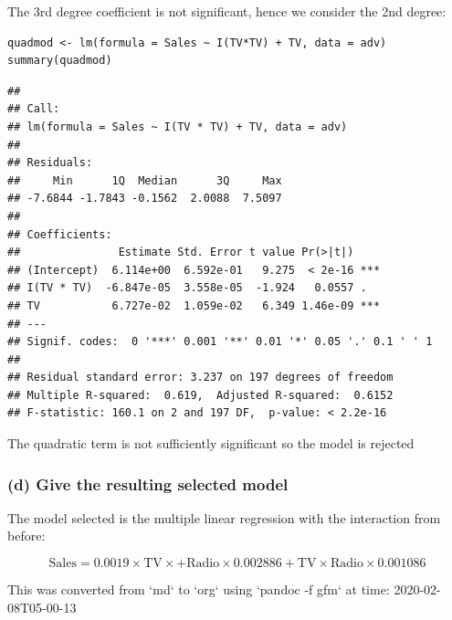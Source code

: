 \documentclass[11pt]{article}
\begin{document}
The 3rd degree coefficient is not significant, hence we consider the 2nd
degree:

\begin{verbatim}
quadmod <- lm(formula = Sales ~ I(TV*TV) + TV, data = adv)
summary(quadmod)
\end{verbatim}

\begin{verbatim}
## 
## Call:
## lm(formula = Sales ~ I(TV * TV) + TV, data = adv)
## 
## Residuals:
##     Min      1Q  Median      3Q     Max 
## -7.6844 -1.7843 -0.1562  2.0088  7.5097 
## 
## Coefficients:
##               Estimate Std. Error t value Pr(>|t|)    
## (Intercept)  6.114e+00  6.592e-01   9.275  < 2e-16 ***
## I(TV * TV)  -6.847e-05  3.558e-05  -1.924   0.0557 .  
## TV           6.727e-02  1.059e-02   6.349 1.46e-09 ***
## ---
## Signif. codes:  0 '***' 0.001 '**' 0.01 '*' 0.05 '.' 0.1 ' ' 1
## 
## Residual standard error: 3.237 on 197 degrees of freedom
## Multiple R-squared:  0.619,  Adjusted R-squared:  0.6152 
## F-statistic: 160.1 on 2 and 197 DF,  p-value: < 2.2e-16
\end{verbatim}

The quadratic term is not sufficiently significant so the model is
rejected

\subsubsection{(d) Give the resulting selected model}
\label{sec:org1bd734f}
The model selected is the multiple linear regression with the
interaction from before:

$$
  \text{Sales} = 0.0019 \times \text{TV} \times + \text{Radio} \times  0.002886 + \text{TV} \times \text{Radio} \times 0.001086
  $$

This was converted from `md` to `org` using `pandoc -f gfm` at time: 
2020-02-08T05-00-13
\end{document}
